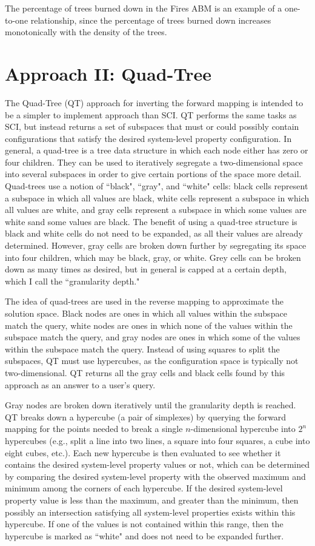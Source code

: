 The percentage of trees burned down in the Fires ABM is an example of a one-to-one relationship, since the percentage of trees burned down increases monotonically with the density of the trees.


\section{\fw Approach II: Quad-Tree}
The Quad-Tree (QT) approach for inverting the forward mapping is intended to be a simpler to implement approach than SCI.
QT performs the same tasks as SCI, but instead returns a set of subspaces that must or could possibly contain configurations that satisfy the desired system-level property configuration.
In general, a quad-tree is a tree data structure in which each node either has zero or four children.
They can be used to iteratively segregate a two-dimensional space into several subspaces in order to give certain portions of the space more detail.
Quad-trees use a notion of ``black", ``gray", and ``white" cells: black cells represent a subspace in which all values are black, white cells represent a subspace in which all values are white, and gray cells represent a subspace in which some values are white sand some values are black.
The benefit of using a quad-tree structure is black and white cells do not need to be expanded, as all their values are already determined.
However, gray cells are broken down further by segregating its space into four children, which may be black, gray, or white.
Grey cells can be broken down as many times as desired, but in general is capped at a certain depth, which I call the ``granularity depth."

The idea of quad-trees are used in the reverse mapping to approximate the solution space.
Black nodes are ones in which all values within the subspace match the query,
white nodes are ones in which none of the values within the subspace match the query,
and gray nodes are ones in which some of the values within the subspace match the query.
Instead of using squares to split the subspaces, QT must use hypercubes, as the configuration space is typically not two-dimensional.
QT returns all the gray cells and black cells found by this approach as an answer to a user's query.

Gray nodes are broken down iteratively until the granularity depth is reached.
QT breaks down a hypercube (a pair of simplexes) by querying the forward mapping for the points needed to break a single $n$-dimensional hypercube into $2^n$ hypercubes (e.g., split a line into two lines, a square into four squares, a cube into eight cubes, etc.).
Each new hypercube is then evaluated to see whether it contains the desired system-level property values or not, which can be determined by comparing the desired system-level property with the observed maximum and minimum among the corners of each hypercube.
If the desired system-level property value is less than the maximum, and greater than the minimum, then possibly an intersection satisfying all system-level properties exists within this hypercube.
If one of the values is not contained within this range, then the hypercube is marked as ``white" and does not need to be expanded further.

